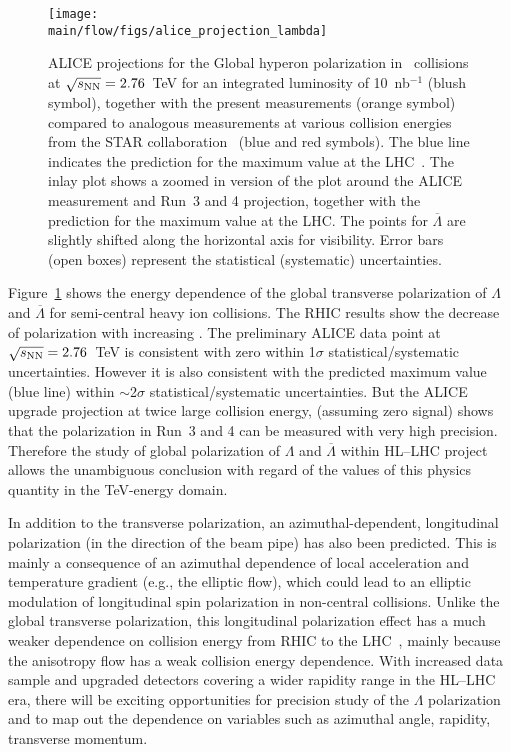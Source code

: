 \begin{figure*}[!htb]
\begin{center}
\texttt{[image: \\main/flow/figs/alice\_projection\_lambda]}
\caption{
ALICE projections for the Global hyperon polarization in \pbpb\ 
  collisions at $\sqrt{s_{\mathrm{NN}}}=2.76$~TeV for an integrated luminosity of 
  10~nb$^{-1}$ (blush symbol), together with the present measurements (orange symbol) 
  compared to analogous measurements at various collision energies from the STAR 
  collaboration~\cite{STAR:2017ckg, Abelev:2007zk} (blue and red symbols). 
The blue line indicates the prediction for the maximum value at the 
  LHC~\cite{Voloshin:ICPPA2}. 
The inlay plot shows a zoomed in version of the plot around the ALICE 
  measurement and Run~3 and 4 projection, together with the prediction 
  for the maximum value at the LHC.
The points for $\overline{\Lambda}$ are slightly shifted along the horizontal 
  axis for visibility.  
Error bars (open boxes) represent the statistical (systematic) uncertainties.}
\label{fig:alice_lambda}
\end{center}
\end{figure*}

Figure~\ref{fig:alice_lambda} shows the energy dependence of the global 
  transverse polarization of $\Lambda$ and $\overline{\Lambda}$ for
  semi-central heavy ion collisions. 
The RHIC results show the decrease of polarization with increasing \snn. 
The preliminary ALICE data point at $\sqrt{s_{\mathrm{NN}}}=2.76$~TeV is consistent with zero
  within 1$\sigma$ statistical/systematic uncertainties.
However it is also consistent with the predicted maximum value (blue line)
  within $\sim$2$\sigma$ statistical/systematic uncertainties.
But the ALICE upgrade projection at twice large collision energy,
  (assuming zero signal) shows that the polarization in Run~3 
  and 4 can be measured with very high precision. 
Therefore the study of global polarization of $\Lambda$ and $\overline{\Lambda}$ 
  within HL--LHC project allows the unambiguous conclusion with regard of the 
  values of this physics quantity in the TeV-energy domain. 

In addition to the transverse polarization, an azimuthal-dependent, 
  longitudinal polarization (in the direction of the beam pipe) has 
  also been predicted. 
This is mainly a consequence of an azimuthal dependence of local acceleration 
  and temperature gradient (e.g., the elliptic flow), which could lead to an 
  elliptic modulation of longitudinal spin polarization in 
  non-central collisions. 
Unlike the global transverse polarization, this longitudinal polarization 
  effect has a much weaker dependence on collision energy from RHIC to 
  the LHC~\cite{Karpenko:2017dui}, mainly because the anisotropy flow has a 
  weak collision energy dependence. 
With increased data sample and upgraded detectors covering a wider rapidity 
  range in the HL--LHC era, there will be exciting opportunities for precision
  study of the $\Lambda$ polarization and to map out the dependence on variables 
  such as azimuthal angle, rapidity, transverse momentum.

